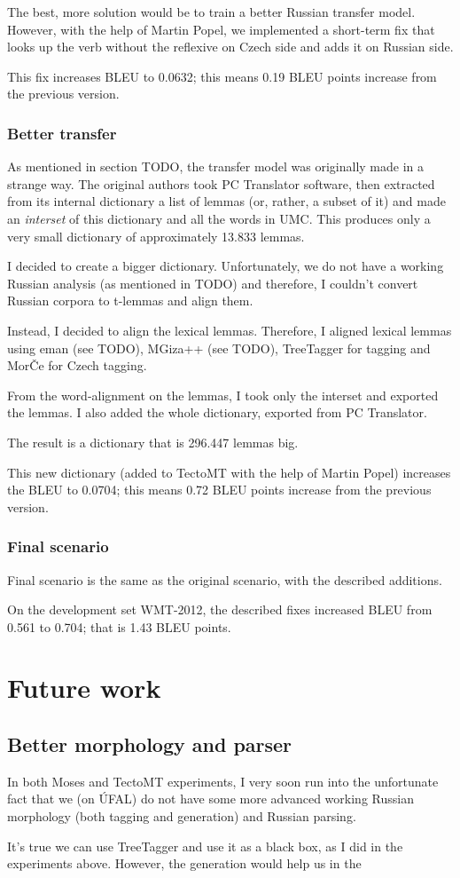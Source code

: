 The best, more  solution would be to train a better Russian transfer model. However, with the help of Martin Popel, we implemented a short-term fix that looks up the verb without the reflexive on Czech side and adds it on Russian side.

This fix increases BLEU to 0.0632; this means 0.19 BLEU points increase from the previous version. 

\subsubsection{Better transfer}
As mentioned in section TODO, the transfer model was originally made in a strange way. 
The original authors took PC Translator software, then extracted from its internal dictionary a list of lemmas (or, rather, a subset of it) and made an \emph{interset} of this dictionary and all the words in UMC. This produces only a very small dictionary of approximately 13.833 lemmas. 

I decided to create a bigger dictionary. Unfortunately, we do not have a working Russian analysis (as mentioned in TODO) and therefore, I couldn't convert Russian corpora to t-lemmas and align them.

Instead, I decided to align  the lexical lemmas. Therefore, I aligned lexical lemmas using eman (see TODO), MGiza++ (see TODO), TreeTagger for tagging and MorČe for Czech tagging.

From the word-alignment on the lemmas, I took only the interset and exported the lemmas. I also added the whole dictionary, exported from PC Translator. 

The result is a dictionary that is 296.447 lemmas big.

This new dictionary (added to TectoMT with the help of Martin Popel) increases the BLEU to 0.0704; this means 0.72 BLEU points increase from the previous version.
\subsubsection{Final scenario}
Final scenario is the same as the original scenario, with the described additions.

On the development set WMT-2012, the described fixes increased BLEU from 0.561 to 0.704; that is 1.43 BLEU points.
\section{Future work}
\subsection{Better morphology and parser}
In both Moses and TectoMT experiments, I very soon run into the unfortunate fact that we (on ÚFAL) do not have some more advanced working Russian morphology (both tagging and generation) and Russian parsing.

It's true we can use TreeTagger and use it as a black box, as I did in the experiments above. 
However, the generation would help us in the 
